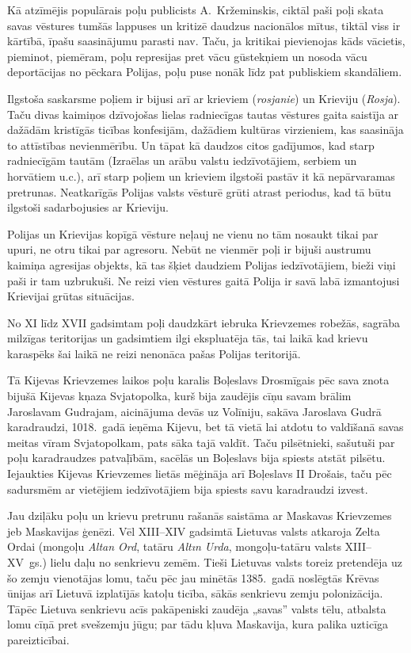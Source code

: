 \documentclass[twoside,a5paper,12pt,fleqn,openany]{extbook}
\newcommand{\pltxti}[1]{\textit{\textpolish{#1}}}
\newcommand{\mntxti}[1]{\textit{#1}}
\newcommand{\tttxti}[1]{\textit{#1}}
\begin{document}
Kā atzīmējis populārais poļu publicists A.~Kržeminskis, ciktāl paši poļi skata savas vēstures tumšās lappuses un kritizē daudzus nacionālos mītus, tiktāl viss ir kārtībā, īpašu saasinājumu parasti nav. Taču, ja kritikai pievienojas kāds vācietis, pieminot, piemēram, poļu represijas pret vācu gūstekņiem un nosoda vācu deportācijas no pēckara Polijas, poļu puse nonāk līdz pat publiskiem skandāliem.

Ilgstoša saskarsme poļiem ir bijusi arī ar krieviem (\pltxti{rosjanie}) un Krieviju (\pltxti{Rosja}). Taču divas kaimiņos dzīvojošas lielas radniecīgas tautas vēstures gaita saistīja ar dažādām kristīgās ticības konfesijām, dažādiem kultūras virzieniem, kas saasināja to attīstības nevienmērību. Un tāpat kā daudzos citos gadījumos, kad starp radniecīgām tautām (Izraēlas un arābu valstu iedzīvotājiem, serbiem un horvātiem u.c.), arī starp poļiem un krieviem ilgstoši pastāv it kā nepārvaramas pretrunas. Neatkarīgās Polijas valsts vēsturē grūti atrast periodus, kad tā būtu ilgstoši sadarbojusies ar Krieviju.

Polijas un Krievijas kopīgā vēsture neļauj ne vienu no tām nosaukt tikai par upuri, ne otru tikai par agresoru. Nebūt ne vienmēr poļi ir bijuši austrumu kaimiņa agresijas objekts, kā tas šķiet daudziem Polijas iedzīvotājiem, bieži viņi paši ir tam uzbrukuši. Ne reizi vien vēstures gaitā Polija ir savā labā izmantojusi Krievijai grūtas situācijas.

No XI līdz XVII gadsimtam poļi daudzkārt iebruka Krievzemes robežās, sagrāba milzīgas teritorijas un gadsimtiem ilgi ekspluatēja tās, tai laikā kad krievu karaspēks šai laikā ne reizi nenonāca pašas Polijas teritorijā.

Tā Kijevas Krievzemes laikos poļu karalis Boļeslavs Drosmīgais pēc sava znota bijušā Kijevas kņaza Svjatopolka, kurš bija zaudējis cīņu savam brālim Jaroslavam Gudrajam, aicinājuma devās uz Volīniju, sakāva Jaroslava Gudrā karadraudzi, 1018.~gadā ieņēma Kijevu, bet tā vietā lai atdotu to valdīšanā savas meitas vīram Svjatopolkam, pats sāka tajā valdīt. Taču pilsētnieki, sašutuši par poļu karadraudzes patvaļībām, sacēlās un Boļeslavs bija spiests atstāt pilsētu. Iejaukties Kijevas Krievzemes lietās mēģināja arī Boļeslavs II Drošais, taču pēc sadursmēm ar vietējiem iedzīvotājiem bija spiests savu karadraudzi izvest.

Jau dziļāku poļu un krievu pretrunu rašanās saistāma ar Maskavas Krievzemes jeb Maskavijas ģenēzi. Vēl XIII--XIV gadsimtā Lietuvas valsts atkaroja Zelta Ordai (mongoļu \mntxti{Altan Ord}, tatāru \tttxti{Altın Urda}, mongoļu-tatāru valsts XIII--XV~gs.) lielu daļu no senkrievu zemēm. Tieši Lietuvas valsts toreiz pretendēja uz šo zemju vienotājas lomu, taču pēc jau minētās 1385.~gadā noslēgtās Krēvas ūnijas arī Lietuvā izplatījās katoļu ticība, sākās senkrievu zemju polonizācija. Tāpēc Lietuva senkrievu acīs pakāpeniski zaudēja „savas” valsts tēlu, atbalsta lomu cīņā pret svešzemju jūgu; par tādu kļuva Maskavija, kura palika uzticīga pareizticībai.
\end{document}
